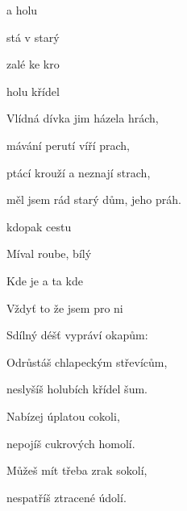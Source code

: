 

\zs
{}  a  holu

stá v   starý 

  zalé ke kro

   holu křídel 
\ks

\zs
Vlídná dívka jim házela hrách,

mávání perutí víří prach,

ptácí krouží a neznají strach,

měl jsem rád starý dům, jeho práh.
\ks

\zr
{} 

kdopak  cestu 

Míval  roube, bílý 

Kde je  a ta  kde 

Vždyť to  že jsem  pro ni 
\kr

\zs
Sdílný déšť vypráví okapům:


Odrůstáš chlapeckým střevícům,

neslyšíš holubích křídel šum.
\ks

\zs
Nabízej úplatou cokoli,

nepojíš cukrových homolí.

Můžeš mít třeba zrak sokolí,

nespatříš ztracené údolí.
\ks

\zr  \kr

\kp





